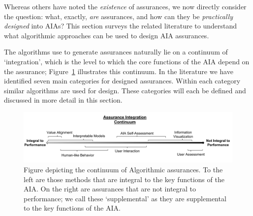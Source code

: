     Whereas others have noted the \textit{existence} of assurances, we now directly consider the question: what, exactly, \textit{are} assurances, and how can they be \textit{practically designed} into AIAs? 
    This section surveys the related literature to understand what algorithmic approaches can be used to design AIA assurances. 
    
    The algorithms use to generate assurances naturally lie on a continuum of `integration', which is the level to which the core functions of the AIA depend on the assurance; Figure~\ref{fig:assurance_continuum} illustrates this continuum. In the literature we have identified seven main categories for designed assurances. Within each category similar algorithms are used for design. These categories will each be defined and discussed in more detail in this section.

    \begin{figure}[!b]%
        \centering
        \includegraphics[width=1.0\textwidth]{Figures/Assurance_Integration.pdf}
        \caption{Figure depicting the continuum of Algorithmic assurances. To the left are those methods that are integral to the key functions of the AIA. On the right are assurances that are not integral to performance; we call these `supplemental' as they are supplemental to the key functions of the AIA.}
        \label{fig:assurance_continuum}
    \end{figure}









